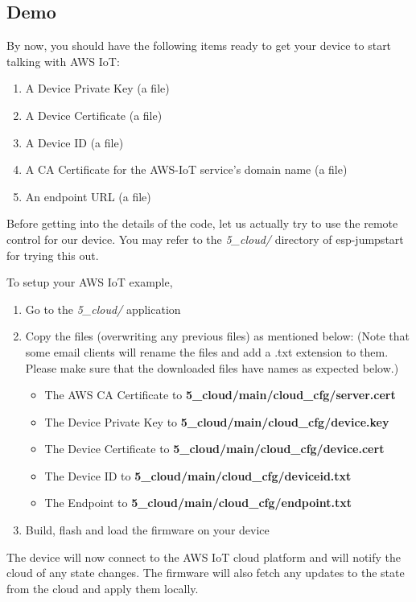 \documentclass[main.tex]{subfiles}
\begin{document}
\subsection{Demo}
By now, you should have the following items ready to get your device to start talking with AWS IoT:
\begin{enumerate}
    \item A Device Private Key (a file)
    \item A Device Certificate (a file)
    \item A Device ID (a file)
    \item A CA Certificate for the AWS-IoT service's domain name (a file)
    \item An endpoint URL (a file)      
\end{enumerate}

Before getting into the details of the code, let us actually try to use the remote control for our device.
You may refer to the \textit{5\_cloud/} directory of esp-jumpstart for trying this out.

To setup your AWS IoT example, 
\begin{enumerate}
    \item Go to the \textit{5\_cloud/} application
    \item Copy the files (overwriting any previous files) as mentioned below: (Note that some email clients will rename the files and add a .txt extension to them. Please make sure that the downloaded files have names as expected below.)
    \begin{itemize}
        \item The AWS CA Certificate to \textbf{5\_cloud/main/cloud\_cfg/server.cert}
        \item The Device Private Key to \textbf{5\_cloud/main/cloud\_cfg/device.key}
        \item The Device Certificate to \textbf{5\_cloud/main/cloud\_cfg/device.cert}
        \item The Device ID to \textbf{5\_cloud/main/cloud\_cfg/deviceid.txt}
        \item The Endpoint to \textbf{5\_cloud/main/cloud\_cfg/endpoint.txt}
    \end{itemize}
    \item Build, flash and load the firmware on your device
\end{enumerate}

The device will now connect to the AWS IoT cloud platform and will notify the cloud of any state changes. The firmware will also fetch any updates to the state from the cloud and apply them locally. 
\end{document}
